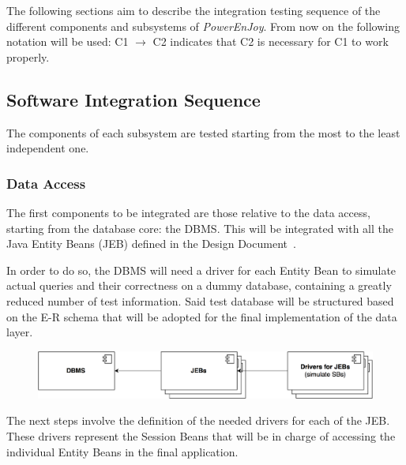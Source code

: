 The following sections aim to describe the integration testing sequence of the different components and subsystems of \emph{PowerEnJoy}. From now on the following notation will be used: C1 $\rightarrow$ C2 indicates that C2 is necessary for C1 to work properly.

\subsection{Software Integration Sequence}
The components of each subsystem are tested starting from the most to the least independent one.

\subsubsection{Data Access}
The first components to be integrated are those relative to the data access, starting from the database core: the DBMS. This will be integrated with all the Java Entity Beans (JEB) defined in the Design Document~\cite{dd}. 


In order to do so, the DBMS will need a driver for each Entity Bean to simulate actual queries and their correctness on a dummy database, containing a greatly reduced number of test information. Said test database will be structured based on the E-R schema that will be adopted for the final implementation of the data layer.

\begin{figure}[H]
\begin{center}
		\includegraphics[width=\textwidth]{./integration_strategy/diagrams/data_access.png}
\end{center}
\end{figure}

The next steps involve the definition of the needed drivers for each of the JEB. These drivers represent the Session Beans that will be in charge of accessing the individual Entity Beans in the final application.

